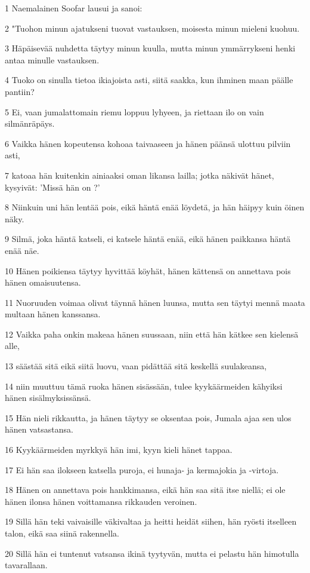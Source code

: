 \par 1 Naemalainen Soofar lausui ja sanoi:
\par 2 "Tuohon minun ajatukseni tuovat vastauksen, moisesta minun mieleni kuohuu.
\par 3 Häpäisevää nuhdetta täytyy minun kuulla, mutta minun ymmärrykseni henki antaa minulle vastauksen.
\par 4 Tuoko on sinulla tietoa ikiajoista asti, siitä saakka, kun ihminen maan päälle pantiin?
\par 5 Ei, vaan jumalattomain riemu loppuu lyhyeen, ja riettaan ilo on vain silmänräpäys.
\par 6 Vaikka hänen kopeutensa kohoaa taivaaseen ja hänen päänsä ulottuu pilviin asti,
\par 7 katoaa hän kuitenkin ainiaaksi oman likansa lailla; jotka näkivät hänet, kysyivät: 'Missä hän on ?'
\par 8 Niinkuin uni hän lentää pois, eikä häntä enää löydetä, ja hän häipyy kuin öinen näky.
\par 9 Silmä, joka häntä katseli, ei katsele häntä enää, eikä hänen paikkansa häntä enää näe.
\par 10 Hänen poikiensa täytyy hyvittää köyhät, hänen kättensä on annettava pois hänen omaisuutensa.
\par 11 Nuoruuden voimaa olivat täynnä hänen luunsa, mutta sen täytyi mennä maata multaan hänen kanssansa.
\par 12 Vaikka paha onkin makeaa hänen suussaan, niin että hän kätkee sen kielensä alle,
\par 13 säästää sitä eikä siitä luovu, vaan pidättää sitä keskellä suulakeansa,
\par 14 niin muuttuu tämä ruoka hänen sisässään, tulee kyykäärmeiden kähyiksi hänen sisälmyksissänsä.
\par 15 Hän nieli rikkautta, ja hänen täytyy se oksentaa pois, Jumala ajaa sen ulos hänen vatsastansa.
\par 16 Kyykäärmeiden myrkkyä hän imi, kyyn kieli hänet tappaa.
\par 17 Ei hän saa ilokseen katsella puroja, ei hunaja- ja kermajokia ja -virtoja.
\par 18 Hänen on annettava pois hankkimansa, eikä hän saa sitä itse niellä; ei ole hänen ilonsa hänen voittamansa rikkauden veroinen.
\par 19 Sillä hän teki vaivaisille väkivaltaa ja heitti heidät siihen, hän ryösti itselleen talon, eikä saa siinä rakennella.
\par 20 Sillä hän ei tuntenut vatsansa ikinä tyytyvän, mutta ei pelastu hän himotulla tavarallaan.
